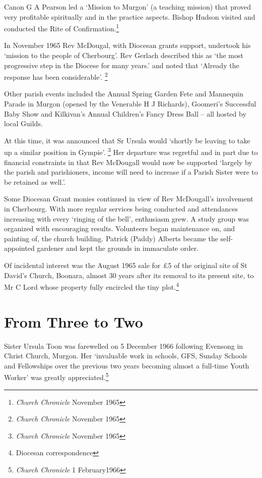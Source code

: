 Canon G A Pearson led a `Mission to Murgon' (a teaching mission) that proved very profitable spiritually and in the practice aspects. Bishop Hudson visited and conducted the Rite of Confirmation.\footnote{\emph{Church Chronicle} November 1965}

In November 1965 Rev McDougal, with Diocesan grants support, undertook his `mission to the people of Cherbourg'. Rev Gerlach described this as `the most progressive step in the Diocese for many years.' and noted that `Already the response has been considerable'. \footnote{\emph{Church Chronicle} November 1965}

Other parish events included the Annual Spring Garden Fete and Mannequin Parade in Murgon (opened by the Venerable H J Richards), Goomeri's Successful Baby Show and Kilkivan's Annual Children's Fancy Dress Ball -- all hosted by local Guilds.

At this time, it was announced that Sr Ursula would `shortly be leaving to take up a similar position in Gympie'. \footnote{\emph{Church Chronicle} November 1965} Her departure was regretful and in part due to financial constraints in that Rev McDougall would now be supported `largely by the parish and parishioners, income will need to increase if a Parish Sister were to be retained as well.'.

Some Diocesan Grant monies continued in view of Rev McDougall's involvement in Cherbourg. With more regular services being conducted and attendances increasing with every `ringing of the bell', enthusiasm grew. A study group was organized with encouraging results. Volunteers began maintenance on, and painting of, the church building. Patrick (Paddy) Alberts became the self-appointed gardener and kept the grounds in immaculate order.

Of incidental interest was the August 1965 sale for £5 of the original site of St David's Church, Boonara, almost 30 years after its removal to its present site, to Mr C Lord whose property fully encircled the tiny plot.\footnote{Diocesan correspondence}

\hypertarget{from-three-to-two}{%
\section{From Three to Two}\label{from-three-to-two}}

Sister Ursula Toon was farewelled on 5 December 1966 following Evensong in Christ Church, Murgon. Her `invaluable work in schools, GFS, Sunday Schools and Fellowships over the previous two years becoming almost a full-time Youth Worker' was greatly appreciated.\footnote{\emph{Church Chronicle} 1 February1966}

